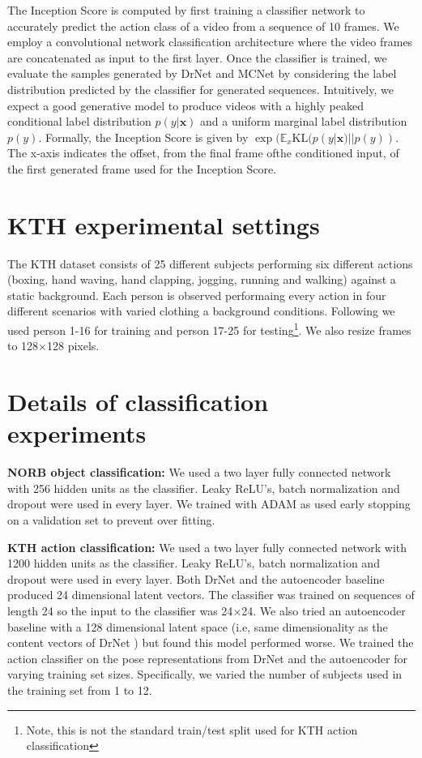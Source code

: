 \documentclass{article}
\newcommand{\drnet}{{\sc DrNet} }
\begin{document}
The Inception Score is computed by first training a classifier network to
accurately predict the action class of a video from a sequence of 10 frames. We employ a convolutional network classification architecture 
where the video frames are concatenated as input to the first layer. 
Once the classifier is trained, we evaluate the samples generated by \drnet and MCNet by considering the label distribution predicted by the classifier for generated sequences.
Intuitively, we expect a good generative model to produce videos with a highly peaked conditional label distribution $p(y|\mathbf{x})$ and a uniform marginal label distribution $p(y)$. 
Formally, the Inception Score is given by $\exp(\mathbb{E}_x \text{KL}(p(y|\mathbf{x}) ||p(y))$.
The x-axis indicates the offset, from the final frame ofthe  conditioned input, of the first generated frame used for the Inception Score. 

\section{KTH experimental settings}
The KTH dataset consists of 25 different subjects performing six different actions (boxing, hand waving, hand clapping, jogging, running and walking) against a static background. Each person is observed performaing every action in four different scenarios with varied clothing a background conditions. 
Following \cite{Villegas17} we used person 1-16 for training and person 17-25 for testing\footnote{Note, this is not the standard train/test split used for KTH action classification}. We also resize frames to 128$\times$128 pixels. 

\section{Details of classification experiments}\label{sec:kth_details}\textbf{NORB object classification:} We used a two layer fully connected network with 256 hidden units as the classifier.  
Leaky ReLU's, batch normalization and dropout were used in every layer.
We trained with ADAM as used early stopping on a validation set to prevent over fitting.

\textbf{KTH action classification:} 
We used a two layer fully connected network with 1200 hidden units as the classifier.  
Leaky ReLU's, batch normalization and dropout were used in every layer.
Both \drnet and the autoencoder baseline produced 24 dimensional latent vectors.
The classifier was trained on sequences of length 24 so the input to the classifier was 24$\times$24.
We also tried an autoencoder baseline with a 128 dimensional latent space (i.e, same dimensionality as the content vectors of \drnet) but found this model performed worse.
We trained the action classifier on the pose representations from \drnet and the autoencoder for varying training set sizes. 
Specifically, we varied the number of subjects used in the training set from 1 to 12. 
\end{document}

